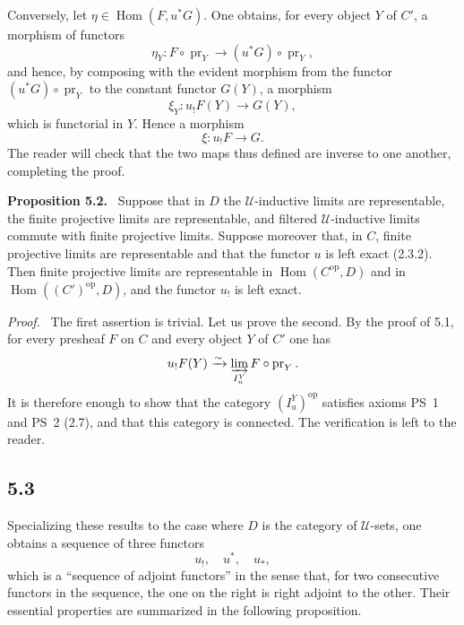 \documentclass[11pt]{article}
\newcommand{\U}{\mathcal{U}}
\newcommand{\Hom}{\operatorname{Hom}}
\newcommand{\op}{\mathrm{op}}
\newcommand{\pr}{\operatorname{pr}}
\newcommand{\Hhom}{\operatorname{Hom}}
\newenvironment{statement}[1]{\par\medskip\noindent\textbf{#1.}\ }{\par\medskip}
\newenvironment{proofsketch}{\par\noindent\emph{Proof.}\ }{\par\medskip}
\begin{document}
Conversely, let $\eta\in\Hom(F,u^*G)$. One obtains, for every object $Y$ of $C'$, a morphism of functors
\[
\eta_Y:F\circ \pr_Y\longrightarrow (u^*G)\circ \pr_Y,
\]
and hence, by composing with the evident morphism from the functor $(u^*G)\circ\pr_Y$ to the constant functor $G(Y)$, a morphism
\[
\xi_Y:u_!F(Y)\longrightarrow G(Y),
\]
which is functorial in $Y$. Hence a morphism
\[
\xi:u_!F\longrightarrow G.
\]
The reader will check that the two maps thus defined are inverse to one another, completing the proof.

\begin{statement}{Proposition 5.2}
Suppose that in $D$ the $\U$-inductive limits are representable, the finite projective limits are representable, and filtered $\U$-inductive limits commute with finite projective limits. Suppose moreover that, in $C$, finite projective limits are representable and that the functor $u$ is left exact (2.3.2). Then finite projective limits are representable in $\Hhom(C^{\op},D)$ and in $\Hhom((C')^{\op},D)$, and the functor $u_!$ is left exact.
\end{statement}

\begin{proofsketch}
The first assertion is trivial. Let us prove the second. By the proof of 5.1, for every presheaf $F$ on $C$ and every object $Y$ of $C'$ one has
\[
u_!F(Y)\xrightarrow{\sim}\varinjlim_{I_u^Y}F\circ\pr_Y.
\]
It is therefore enough to show that the category $(I_u^Y)^{\op}$ satisfies axioms PS~1 and PS~2 (2.7), and that this category is connected. The verification is left to the reader.
\end{proofsketch}

\subsection*{5.3}
Specializing these results to the case where $D$ is the category of $\U$-sets, one obtains a sequence of three functors
\[
u_!,\quad u^*,\quad u_*,
\]
which is a ``sequence of adjoint functors'' in the sense that, for two consecutive functors in the sequence, the one on the right is right adjoint to the other. Their essential properties are summarized in the following proposition.
\end{document}
